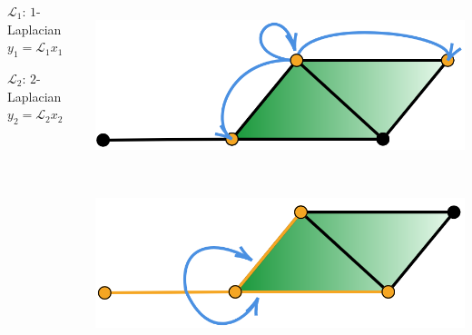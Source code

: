\documentclass[landscape,a0paper]{tikzposter}
\begin{document}
\begin{columns}
{{\begin{center}
\begin{minipage}{0.2\linewidth}
      \end{minipage}\hspace{4.5cm}
      \begin{minipage}{0.2\linewidth}
         \begin{center}
		  $\mathcal{L_1}$: $1$-Laplacian\\
		$y_1=\mathcal{L_1}x_1$
	\end{center}
      \end{minipage} \hspace{4.5cm}
	\begin{minipage}{0.2\linewidth}
         \begin{center}
		 $\mathcal{L_2}$: $2$-Laplacian\\
		$y_2=\mathcal{L_2}x_2$
	\end{center}
      \end{minipage} 
      
      \end{center}
      
\begin{center}
		 \begin{minipage}{0.2\linewidth}
		 \begin{center}
		
          \includegraphics[height=4.8cm]{figures/glap0.png}

          \vspace{1cm}
        
          \end{center}
      \end{minipage} \hspace{3.6cm}
      \begin{minipage}{0.2\linewidth}
      \begin{center}
     	\vspace{1.5cm}
          \includegraphics[height=4.58cm]{figures/glap1.png}
          

\end{center}
\end{minipage}
\end{center}}}
\end{columns}
\end{document}
